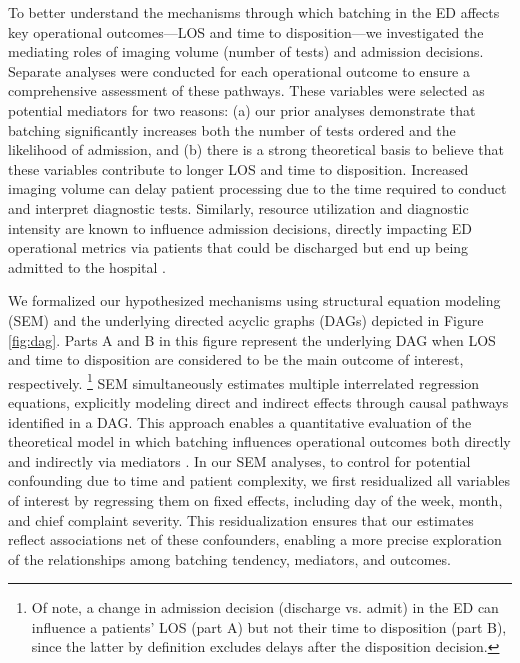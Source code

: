 \documentclass[,,nonblindrev]{informs}
\begin{document}
To better understand the mechanisms through which batching in the ED
affects key operational outcomes---LOS and time to disposition---we
investigated the mediating roles of imaging volume (number of tests) and
admission decisions. Separate analyses were conducted for each
operational outcome to ensure a comprehensive assessment of these
pathways. These variables were selected as potential mediators for two
reasons: (a) our prior analyses demonstrate that batching significantly
increases both the number of tests ordered and the likelihood of
admission, and (b) there is a strong theoretical basis to believe that
these variables contribute to longer LOS and time to disposition.
Increased imaging volume can delay patient processing due to the time
required to conduct and interpret diagnostic tests. Similarly, resource
utilization and diagnostic intensity are known to influence admission
decisions, directly impacting ED operational metrics via patients that
could be discharged but end up being admitted to the hospital
\citep{hodgson2018are}.

We formalized our hypothesized mechanisms using structural equation
modeling (SEM) and the underlying directed acyclic graphs (DAGs)
depicted in Figure \ref{fig:dag}. Parts A and B in this figure represent
the underlying DAG when LOS and time to disposition are considered to be
the main outcome of interest, respectively.
\footnote{Of note, a change in admission decision (discharge vs. admit) in the ED can influence  a patients' LOS (part A) but not their time to disposition (part B), since the latter by definition excludes delays after the disposition decision.}
SEM simultaneously estimates multiple interrelated regression equations,
explicitly modeling direct and indirect effects through causal pathways
identified in a DAG. This approach enables a quantitative evaluation of
the theoretical model in which batching influences operational outcomes
both directly and indirectly via mediators
\citep[\citet{Zhang2017}]{Beran2010}. In our SEM analyses, to control
for potential confounding due to time and patient complexity, we first
residualized all variables of interest by regressing them on fixed
effects, including day of the week, month, and chief complaint severity.
This residualization ensures that our estimates reflect associations net
of these confounders, enabling a more precise exploration of the
relationships among batching tendency, mediators, and outcomes.
\end{document}
